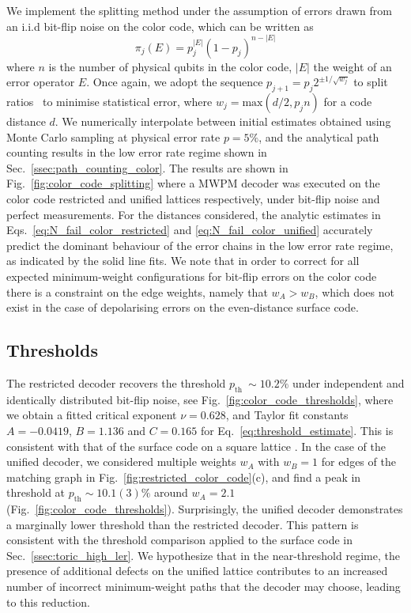 \documentclass[a4paper,twocolumn,11pt,accepted=2024-12-23]{quantumarticle}
\begin{document}
We implement the splitting method under the assumption of errors drawn from an i.i.d bit-flip noise on the color code, which can be written as 
\begin{equation}
    \pi_j(E) = p_j^{|E|}(1-p_j)^{n-|E|}
    \label{eq:error_pdf_color_code}
\end{equation}
where $n$ is the number of physical qubits in the color code, $|E|$ the weight of an error operator $E$. Once again, we adopt the sequence $p_{j+1}=p_j2^{\pm1/\sqrt{w_j}}$ to split ratios~\cite{Bravyi_2013} to minimise statistical error, where $w_j=\text{max}(d/2,p_jn)$ for a code distance $d$. We numerically interpolate between initial estimates obtained using Monte Carlo sampling at physical error rate $p = 5\%$, and the analytical path counting results in the low error rate regime shown in Sec.~\ref{ssec:path_counting_color}. The results are shown in Fig.~\ref{fig:color_code_splitting} where a MWPM decoder was executed on the color code restricted and unified lattices respectively, under bit-flip noise and perfect measurements. For the distances considered, the analytic estimates in Eqs.~\ref{eq:N_fail_color_restricted} and \ref{eq:N_fail_color_unified} accurately predict the dominant behaviour of the error chains in the low error rate regime, as indicated by the solid line fits. We note that in order to correct for all expected minimum-weight configurations for bit-flip errors on the color code there is a constraint on the edge weights, namely that $w_A > w_B$, which does not exist in the case of depolarising errors on the even-distance surface code.


\subsection{\label{ssec:thresh_color} Thresholds} 


The restricted decoder recovers the threshold $p_{\textrm{th}}~\sim 10.2\%$ under independent and identically distributed bit-flip noise, see Fig.~\ref{fig:color_code_thresholds}, where we obtain a fitted critical exponent $\nu = 0.628$, and 
Taylor fit constants $A =-0.0419$, $B = 1.136$ and $C = 0.165$ for Eq.~\ref{eq:threshold_estimate}. This is consistent with that of the surface code on a square lattice \cite{wang2003confinement, delfosse2014decoding}. In the case of the unified decoder, we considered multiple weights $w_A$ with $w_B=1$ for edges of the matching graph in Fig.~\ref{fig:restricted_color_code}(c), and find a peak in threshold at $p_{\textrm{th}} \sim 10.1(3)\%$ around $w_A = 2.1$ (Fig.~\ref{fig:color_code_thresholds}). Surprisingly, the unified decoder demonstrates a marginally lower threshold than the restricted decoder. This pattern is consistent with the threshold comparison applied to the surface code in Sec.~\ref{ssec:toric_high_ler}. We hypothesize that in the near-threshold regime, the presence of additional defects on the unified lattice contributes to an increased number of incorrect minimum-weight paths that the decoder may choose, leading to this reduction.
\end{document}
